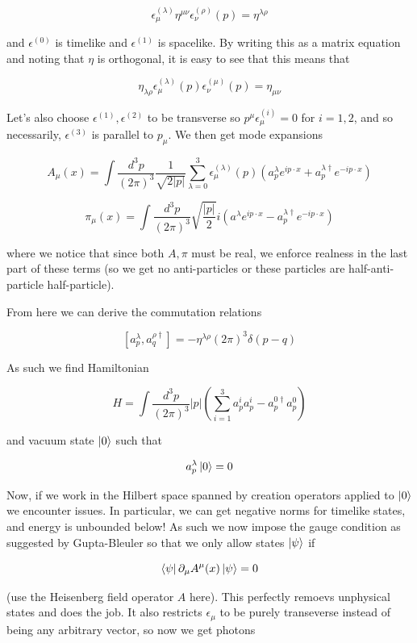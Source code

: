 \documentclass{article}
\theoremstyle{definition}
\begin{document}
$$ \epsilon_\mu^{(\lambda)} \eta^{\mu \nu} \epsilon_\nu^{(\rho)} (p) =
\eta^{\lambda \rho} $$

and $\epsilon^{(0)}$ is timelike and $\epsilon^{(1)}$ is spacelike. By writing
this as a matrix equation and noting that $\eta$ is orthogonal, it is easy to see
that this means that

$$ \eta_{\lambda \rho} \epsilon^{(\lambda)}_\mu(p) \epsilon^{(\mu)}_\nu(p) =
\eta_{\mu \nu} $$

Let's also choose $\epsilon^{(1)}, \epsilon^{(2)}$ to be transverse so $p^\mu
\epsilon_\mu^{(i)} = 0$ for $i=1, 2$, and so necessarily, $\epsilon^(3)$ is
parallel to $p_\mu$. We then get mode expansions

$$ A_\mu(x) = \int \frac{d^3p}{(2\pi)^3} \frac{1}{\sqrt{2 |p|}} \sum_{\lambda =
  0}^3 \epsilon_\mu^{(\lambda)} (p) (a_p^\lambda e^{i p \cdot x} + a^{\lambda
  \dagger}_p e^{-ip \cdot x}) $$

$$ \pi_\mu(x) = \int \frac{d^3p}{(2\pi)^3} \sqrt{\frac{|p|}{2}} i \left(
  a^\lambda e^{ip \cdot x} - a^{\lambda \dagger}_p e^{-i p \cdot x} \right) $$

where we notice that since both $A, \pi$ must be real, we enforce realness in
the last part of these terms (so we get no anti-particles or these particles are
half-anti-particle half-particle).

From here we can derive the commutation relations

$$ [a_p^\lambda, a^{\rho \dagger}_q ] = -\eta^{\lambda \rho} (2\pi)^3 \delta(p
- q) $$

As such we find Hamiltonian

$$ H = \int \frac{d^3p}{(2\pi)^3} |p| \left( \sum_{i = 1}^3 a_p^i a_p^i - a_p^{0
  \dagger} a_p^0 \right) $$

and vacuum state $\ket{0}$ such that

$$ a^\lambda_p \ket{0} = 0 $$

Now, if we work in the Hilbert space spanned by creation operators applied to
$\ket{0}$ we encounter issues. In particular, we can get negative norms for
timelike states, and energy is unbounded below! As such we now impose the
gauge condition as suggested by Gupta-Bleuler so that we only allow states
$\ket{\psi}$ if

$$ \bra{\psi} \partial_\mu A^\mu (x) \ket{\psi} = 0 $$

(use the Heisenberg field operator $A$ here). This perfectly remoevs unphysical
states and does the job. It also restricts $\epsilon_\mu$ to be purely
transeverse instead of being any arbitrary vector, so now we get photons
\end{document}
